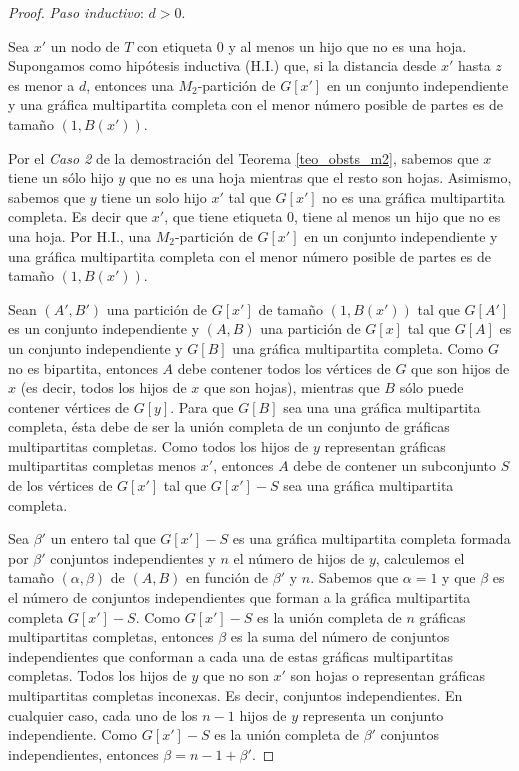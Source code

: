 \begin{proof}
\emph{Paso inductivo}: $d > 0$.

Sea $x'$ un nodo de $T$ con etiqueta 0 y al menos un hijo que no es una hoja. Supongamos como hipótesis inductiva (H.I.) que, si la distancia desde $x'$ hasta $z$ es menor a $d$, entonces una $M_2$-partición de $G[x']$ en un conjunto independiente y una gráfica multipartita completa con el menor número posible de partes es de tamaño $(1,B(x'))$.

Por el \emph{Caso 2} de la demostración del Teorema \ref{teo_obsts_m2}, sabemos que $x$ tiene un sólo hijo $y$ que no es una hoja mientras que el resto son hojas. Asimismo, sabemos que $y$ tiene un solo hijo $x'$ tal que $G[x']$ no es una gráfica multipartita completa. Es decir que $x'$, que tiene etiqueta 0, tiene al menos un hijo que no es una hoja. Por H.I., una $M_2$-partición de $G[x']$ en un conjunto independiente y una gráfica multipartita completa con el menor número posible de partes es de tamaño $(1,B(x'))$.

Sean $(A',B')$ una partición de $G[x']$ de tamaño $(1,B(x'))$ tal que $G[A']$ es un conjunto independiente y $(A,B)$ una partición de $G[x]$ tal que $G[A]$ es un conjunto independiente y $G[B]$ una gráfica multipartita completa. Como $G$ no es bipartita, entonces $A$ debe contener todos los vértices de $G$ que son hijos de $x$ (es decir, todos los hijos de $x$ que son hojas), mientras que $B$ sólo puede contener vértices de $G[y]$. Para que $G[B]$ sea una una gráfica multipartita completa, ésta debe de ser la unión completa de un conjunto de gráficas multipartitas completas. Como todos los hijos de $y$ representan gráficas multipartitas completas menos $x'$, entonces $A$ debe de contener un subconjunto $S$ de los vértices de $G[x']$ tal que $G[x']-S$ sea una gráfica multipartita completa.

Sea $\beta'$ un entero tal que $G[x']-S$ es una gráfica multipartita completa
formada por $\beta'$ conjuntos independientes y $n$ el número de hijos de $y$,
calculemos el tamaño $(\alpha,\beta)$ de $(A,B)$ en función de $\beta'$ y $n$.
Sabemos que $\alpha=1$ y que $\beta$ es el número de conjuntos independientes que
forman a la gráfica multipartita completa $G[x']-S$. Como $G[x']-S$ es la unión
completa de $n$ gráficas multipartitas completas, entonces $\beta$ es la suma del
número de conjuntos independientes que conforman a cada una de estas gráficas
multipartitas completas. Todos los hijos de $y$ que no son $x'$ son hojas o
representan gráficas multipartitas completas inconexas. Es decir, conjuntos independientes. En cualquier caso, cada uno de los $n-1$ hijos de $y$ representa un conjunto independiente. Como $G[x']-S$ es la unión completa de $\beta'$ conjuntos independientes, entonces $\beta = n-1+\beta'$.


\end{proof}
